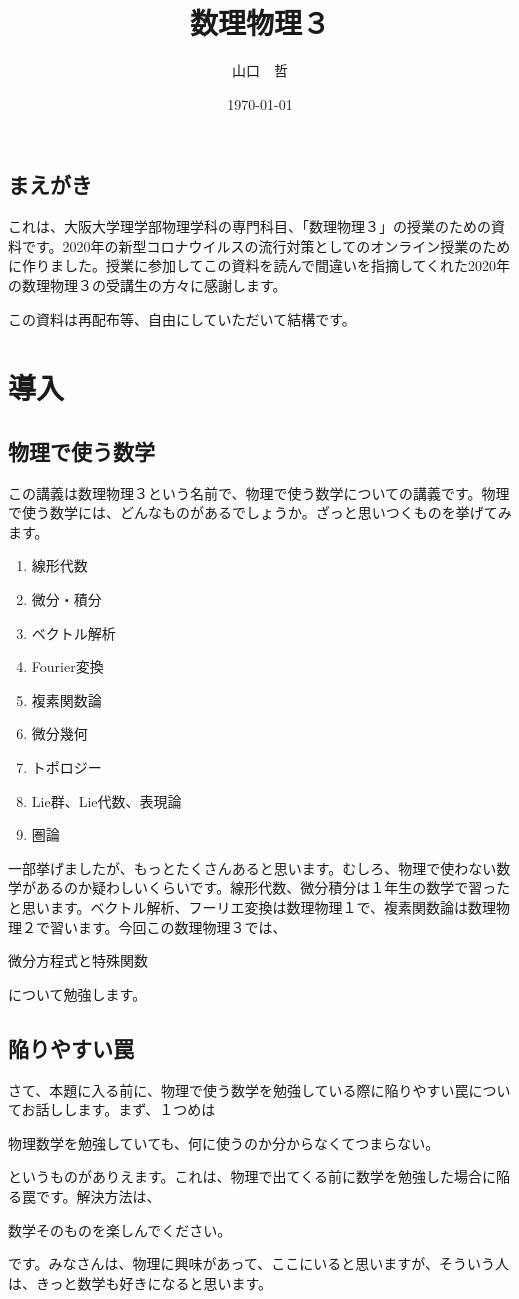 \documentclass[report,paper=a4, fontsize=12pt, line_length=16cm, number_of_lines=33,dvipdfmx]{jlreq}
\title{数理物理３}
\author{山口　哲}
\date{\today}
\newenvironment{myquote}{\begin{tcolorbox}[
  colback = blue!5, after = \noindent] }{\end{tcolorbox}}
\numberwithin{equation}{section}
\begin{document}
\maketitle
\tableofcontents
\section*{まえがき}
これは、大阪大学理学部物理学科の専門科目、「数理物理３」の授業のための資料です。2020年の新型コロナウイルスの流行対策としてのオンライン授業のために作りました。授業に参加してこの資料を読んで間違いを指摘してくれた2020年の数理物理３の受講生の方々に感謝します。

この資料は再配布等、自由にしていただいて結構です。

\chapter{導入}
\section{物理で使う数学}
この講義は数理物理３という名前で、物理で使う数学についての講義です。物理で使う数学には、どんなものがあるでしょうか。ざっと思いつくものを挙げてみます。
\begin{enumerate}
  \item 線形代数
  \item 微分・積分
  \item ベクトル解析
  \item Fourier変換
  \item 複素関数論
  \item 微分幾何
  \item トポロジー
  \item Lie群、Lie代数、表現論
  \item 圏論
\end{enumerate}
一部挙げましたが、もっとたくさんあると思います。むしろ、物理で使わない数学があるのか疑わしいくらいです。線形代数、微分積分は１年生の数学で習ったと思います。ベクトル解析、フーリエ変換は数理物理１で、複素関数論は数理物理２で習います。今回この数理物理３では、
\begin{myquote}
  微分方程式と特殊関数  
\end{myquote}
について勉強します。

\section{陥りやすい罠}
さて、本題に入る前に、物理で使う数学を勉強している際に陥りやすい罠についてお話しします。まず、１つめは
\begin{myquote}
  物理数学を勉強していても、何に使うのか分からなくてつまらない。
\end{myquote}
というものがありえます。これは、物理で出てくる前に数学を勉強した場合に陥る罠です。解決方法は、
\begin{myquote}
  数学そのものを楽しんでください。
\end{myquote}
です。みなさんは、物理に興味があって、ここにいると思いますが、そういう人は、きっと数学も好きになると思います。
\end{document}
